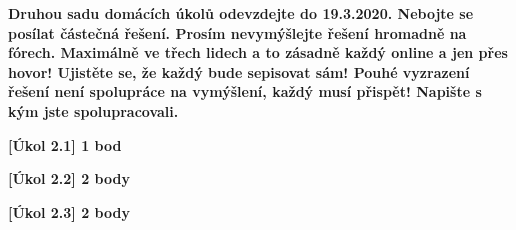 \textbf{
	Druhou sadu domácích úkolů odevzdejte do 19.3.2020.
	Nebojte se posílat částečná řešení.
	Prosím nevymýšlejte řešení hromadně na fórech.
	Maximálně ve třech lidech a to zásadně každý online a jen přes hovor!
	Ujistěte se, že každý bude sepisovat sám!
	Pouhé vyzrazení řešení není spolupráce na vymýšlení, každý musí přispět!
	Napište s kým jste spolupracovali.
}

\textbf{[Úkol 2.1] 1 bod}

\textbf{[Úkol 2.2] 2 body}

\textbf{[Úkol 2.3] 2 body}


